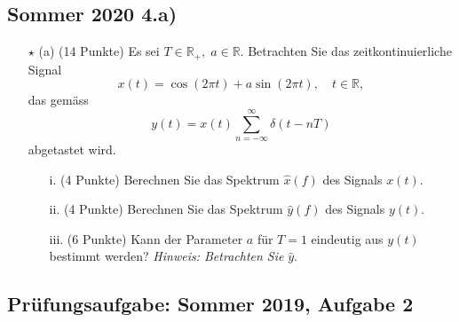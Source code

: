 \documentclass[11pt]{article}
\begin{document}
\subsection*{Sommer 2020 4.a)}
\vspace*{-0.5cm}
\begin{itemize}
    \item[$\star$] (a) (14 Punkte) Es sei $T \in \mathbb{R}_+, \; a \in \mathbb{R}$. Betrachten Sie das zeitkontinuierliche Signal
    $$x(t) = \cos(2 \pi t) + a \sin(2 \pi t), \hspace{12pt} t \in \mathbb{R},$$
    das gemäss
    $$y(t) = x(t)\sum_{n = - \infty}^{\infty} \delta(t-nT)$$
    abgetastet wird.
    \item[] \begin{itemize}
        \item[i.] (4 Punkte) Berechnen Sie das Spektrum $\hat{x}(f)$ des Signals $x(t)$.
        \item[ii.] (4 Punkte) Berechnen Sie das Spektrum $\hat{y}(f)$ des Signals $y(t)$.
        \item[iii.] (6 Punkte) Kann der Parameter $a$ für $T=1$ eindeutig aus $y(t)$ bestimmt werden? \textit{Hinweis: Betrachten Sie } $\hat{y}$.
    \end{itemize}
\end{itemize}

\vfill \null
\pagebreak


\pagebreak

\subsection*{Prüfungsaufgabe: Sommer 2019, Aufgabe 2}
\end{document}
